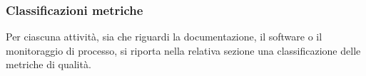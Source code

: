 		




	\subsubsection{Classificazioni metriche} %
	
	Per ciascuna attività, sia che riguardi la documentazione, il software o il monitoraggio di processo, si riporta nella relativa sezione una classificazione delle metriche di qualità. 

	
